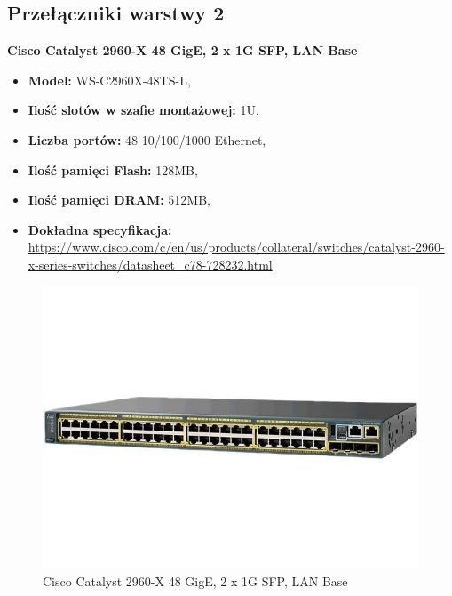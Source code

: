 \documentclass[12pt,a4paper,titlepage]{article}
\begin{document}
\subsection{Przełączniki warstwy 2}
\textbf{Cisco Catalyst 2960-X 48 GigE, 2 x 1G SFP, LAN Base}
\begin{itemize}
    \item \textbf{Model:} WS-C2960X-48TS-L,
    \item \textbf{Ilość slotów w szafie montażowej:} 1U,
    \item \textbf{Liczba portów:} 48 10/100/1000 Ethernet,
    \item \textbf{Ilość pamięci Flash:} 128MB,
    \item \textbf{Ilość pamięci DRAM:} 512MB,
    \item \textbf{Dokładna specyfikacja:}  \url{https://www.cisco.com/c/en/us/products/collateral/switches/catalyst-2960-x-series-switches/datasheet_c78-728232.html}
\end{itemize}
\begin{figure}[H]
  \centering
    \includegraphics[width=14cm]{images/switch2.jpg}
    \caption{Cisco Catalyst 2960-X 48 GigE, 2 x 1G SFP, LAN Base}
    \label{fig:switch2}
\end{figure}

\newpage
\end{document}
